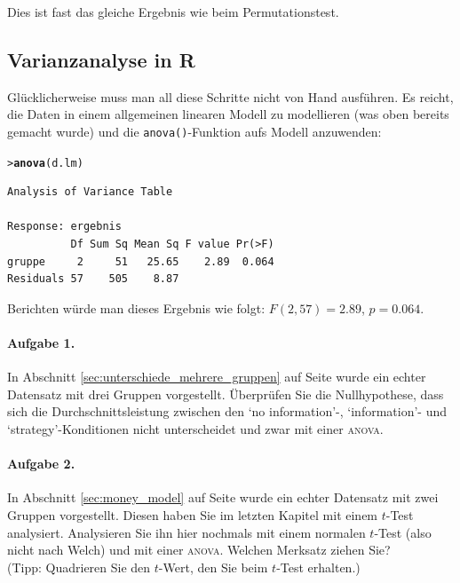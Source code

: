 \documentclass[oneside, 10pt]{book}\usepackage[]{graphicx}\usepackage[]{xcolor}
\makeatletter
\newcommand{\hlstd}[1]{\textcolor[rgb]{0.345,0.345,0.345}{#1}}%
\newcommand{\hlkwd}[1]{\textcolor[rgb]{0.737,0.353,0.396}{\textbf{#1}}}%
\newenvironment{kframe}{%
 \def\at@end@of@kframe{}%
 \ifinner\ifhmode%
  \def\at@end@of@kframe{\end{minipage}}%
  \begin{minipage}{\columnwidth}%
 \fi\fi%
 \def\FrameCommand##1{\hskip\@totalleftmargin \hskip-\fboxsep
 \colorbox{shadecolor}{##1}\hskip-\fboxsep
     \hskip-\linewidth \hskip-\@totalleftmargin \hskip\columnwidth}%
 \MakeFramed {\advance\hsize-\width
   \@totalleftmargin\z@ \linewidth\hsize
   \@setminipage}}%
 {\par\unskip\endMakeFramed%
 \at@end@of@kframe}
\newenvironment{knitrout}{}{} %
\makeatother
\begin{document}
Dies ist fast das gleiche Ergebnis wie beim Permutationstest.

\subsection{Varianzanalyse in R}
Glücklicherweise muss man all diese Schritte nicht von Hand
ausführen. Es reicht, die Daten in einem allgemeinen linearen
Modell zu modellieren (was oben bereits gemacht wurde)
und die \texttt{anova()}-Funktion aufs Modell anzuwenden:
\begin{knitrout}
\color{fgcolor}\begin{kframe}
\begin{alltt}
\hlstd{> }\hlkwd{anova}\hlstd{(d.lm)}
\end{alltt}
\begin{verbatim}
Analysis of Variance Table

Response: ergebnis
          Df Sum Sq Mean Sq F value Pr(>F)
gruppe     2     51   25.65    2.89  0.064
Residuals 57    505    8.87               
\end{verbatim}
\end{kframe}
\end{knitrout}

Berichten würde man dieses Ergebnis wie folgt: $F(2, 57) = 2.89$, $p = 0.064$.

\paragraph{Aufgabe 1.}
In Abschnitt \ref{sec:unterschiede_mehrere_gruppen} auf
Seite \pageref{sec:unterschiede_mehrere_gruppen} wurde
ein echter Datensatz mit drei Gruppen vorgestellt.
Überprüfen Sie die Nullhypothese, dass sich die
Durchschnittsleistung zwischen den `no information'-,
`information'- und `strategy'-Konditionen nicht unterscheidet
und zwar mit einer \textsc{anova}.

\paragraph{Aufgabe 2.}
In Abschnitt \ref{sec:money_model} auf Seite \pageref{sec:money_model}
wurde ein echter Datensatz mit zwei Gruppen vorgestellt.
Diesen haben Sie im letzten Kapitel mit einem $t$-Test analysiert.
Analysieren Sie ihn hier nochmals mit einem normalen $t$-Test (also nicht
nach Welch) und mit einer \textsc{anova}. Welchen Merksatz ziehen Sie?\\
(Tipp: Quadrieren Sie den $t$-Wert, den Sie beim $t$-Test erhalten.)
\end{document}
